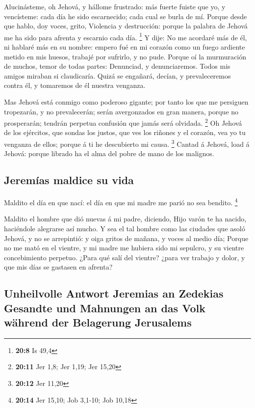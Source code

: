  Alucinásteme, oh Jehová, y hállome frustrado: más fuerte
fuiste que yo, y vencísteme: cada día he sido escarnecido; cada cual se
burla de mí.  Porque desde que hablo, doy voces, grito,
Violencia y destrucción: porque la palabra de Jehová me ha sido para
afrenta y escarnio cada día. \footnote{\textbf{20:8} Is 49,4}
 Y dije: No me acordaré más de él, ni hablaré más en su
nombre: empero fué en mi corazón como un fuego ardiente metido en mis
huesos, trabajé por sufrirlo, y no pude.  Porque oí la
murmuración de muchos, temor de todas partes: Denunciad, y
denunciaremos. Todos mis amigos miraban si claudicaría. Quizá se
engañará, decían, y prevaleceremos contra él, y tomaremos de él nuestra
venganza.

 Mas Jehová está conmigo como poderoso gigante; por tanto
los que me persiguen tropezarán, y no prevalecerán; serán avergonzados
en gran manera, porque no prosperarán; tendrán perpetua confusión que
jamás será olvidada. \footnote{\textbf{20:11} Jer 1,8; Jer 1,19; Jer
  15,20}  Oh Jehová de los ejércitos, que sondas los
justos, que ves los riñones y el corazón, vea yo tu venganza de ellos;
porque á ti he descubierto mi causa. \footnote{\textbf{20:12} Jer 11,20}
 Cantad á Jehová, load á Jehová: porque librado ha el alma
del pobre de mano de los malignos.

\hypertarget{jeremuxedas-maldice-su-vida}{%
\subsection{Jeremías maldice su
vida}\label{jeremuxedas-maldice-su-vida}}

 Maldito el día en que nací: el día en que mi madre me
parió no sea bendito. \footnote{\textbf{20:14} Jer 15,10; Job 3,1-10;
  Job 10,18}

 Maldito el hombre que dió nuevas á mi padre, diciendo,
Hijo varón te ha nacido, haciéndole alegrarse así mucho.  Y
sea el tal hombre como las ciudades que asoló Jehová, y no se
arrepintió: y oiga gritos de mañana, y voces al medio día; 
Porque no me mató en el vientre, y mi madre me hubiera sido mi sepulcro,
y su vientre concebimiento perpetuo.  ¿Para qué salí del
vientre? ¿para ver trabajo y dolor, y que mis días se gastasen en
afrenta?

\hypertarget{unheilvolle-antwort-jeremias-an-zedekias-gesandte-und-mahnungen-an-das-volk-wuxe4hrend-der-belagerung-jerusalems}{%
\subsection{Unheilvolle Antwort Jeremias an Zedekias Gesandte und
Mahnungen an das Volk während der Belagerung
Jerusalems}\label{unheilvolle-antwort-jeremias-an-zedekias-gesandte-und-mahnungen-an-das-volk-wuxe4hrend-der-belagerung-jerusalems}}

